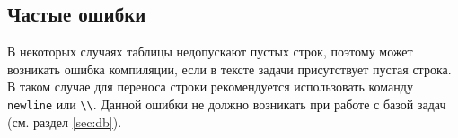 \setcounter{notask}{1}

\subsection{Частые ошибки}

В некоторых случаях таблицы недопускают пустых строк, поэтому может возникать ошибка компиляции, если в
тексте задачи присутствует пустая строка. В таком случае для переноса строки рекомендуется использовать
команду \texttt{newline} или \texttt{\textbackslash\textbackslash}. Данной ошибки не должно возникать при
работе с базой задач (см. раздел \ref{sec:db}).
